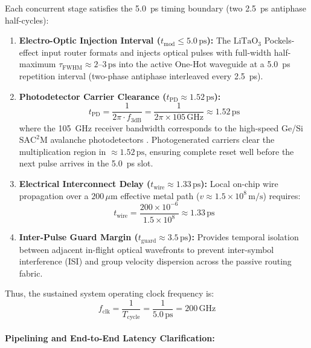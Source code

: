 \documentclass[journal]{IEEEtran}
\begin{document}
Each concurrent stage satisfies the 5.0~ps timing boundary (two 2.5~ps antiphase half-cycles):
\begin{enumerate}
\item \textbf{Electro-Optic Injection Interval ($t_{\text{mod}} \le 5.0\,\text{ps}$):} 
The $\mathrm{LiTaO_3}$ Pockels-effect input router formats and injects optical pulses with full-width half-maximum $\tau_{\text{FWHM}} \approx 2\text{--}3\,\text{ps}$ into the active One-Hot waveguide at a 5.0~ps repetition interval (two-phase antiphase interleaved every 2.5~ps).

\item \textbf{Photodetector Carrier Clearance ($t_{\text{PD}} \approx 1.52\,\text{ps}$):}
\begin{equation*}
t_{\text{PD}} = \frac{1}{2\pi \cdot f_{3\text{dB}}} = \frac{1}{2\pi \times 105\,\text{GHz}} \approx 1.52\,\text{ps}
\end{equation*}
where the 105~GHz receiver bandwidth corresponds to the high-speed Ge/Si $\mathrm{SAC^2M}$ avalanche photodetectors \cite{Chen2025}. Photogenerated carriers clear the multiplication region in $\approx 1.52\,\text{ps}$, ensuring complete reset well before the next pulse arrives in the 5.0~ps slot.

\item \textbf{Electrical Interconnect Delay ($t_{\text{wire}} \approx 1.33\,\text{ps}$):}
Local on-chip wire propagation over a $200\,\mu\text{m}$ effective metal path ($v \approx 1.5 \times 10^8\,\text{m/s}$) requires:
\begin{equation*}
t_{\text{wire}} = \frac{200 \times 10^{-6}}{1.5 \times 10^8} \approx 1.33\,\text{ps}
\end{equation*}

\item \textbf{Inter-Pulse Guard Margin ($t_{\text{guard}} \approx 3.5\,\text{ps}$):}
Provides temporal isolation between adjacent in-flight optical wavefronts to prevent inter-symbol interference (ISI) and group velocity dispersion across the passive routing fabric.
\end{enumerate}

Thus, the sustained system operating clock frequency is:
\begin{equation}
f_{\text{clk}} = \frac{1}{T_{\text{cycle}}} = \frac{1}{5.0\,\text{ps}} = 200\,\text{GHz}
\end{equation}

\paragraph{\textbf{Pipelining and End-to-End Latency Clarification:}}
\end{document}
